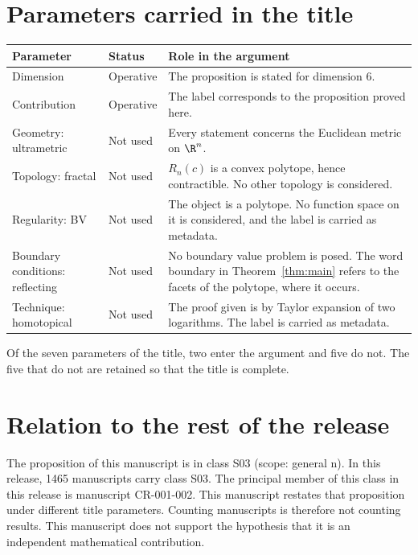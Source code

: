 \documentclass[11pt]{article}
\begin{document}
\section{Parameters carried in the title}\label{sec:params}
\begin{center}
\small
\begin{tabular}{p{}p{}p{}}
\toprule
Parameter & Status & Role in the argument \\
\midrule
Dimension & Operative & The proposition is stated for dimension $6$. \\
Contribution & Operative & The label corresponds to the proposition proved here. \\
Geometry: ultrametric & Not used & Every statement concerns the Euclidean metric on $\R^n$. \\
Topology: fractal & Not used & $R_n(c)$ is a convex polytope, hence contractible. No other topology is considered. \\
Regularity: BV & Not used & The object is a polytope. No function space on it is considered, and the label is carried as metadata. \\
Boundary conditions: reflecting & Not used & No boundary value problem is posed. The word boundary in Theorem~\ref{thm:main} refers to the facets of the polytope, where it occurs. \\
Technique: homotopical & Not used & The proof given is by Taylor expansion of two logarithms. The label is carried as metadata. \\
\bottomrule
\end{tabular}
\end{center}
Of the seven parameters of the title, two enter the argument and five do not. The five that do not are retained so that the title is complete.

\section{Relation to the rest of the release}
The proposition of this manuscript is in class S03 (scope: general n).
In this release, 1465 manuscripts carry class S03. The principal member of this class in this release is manuscript CR-001-002. This manuscript restates that proposition under different title parameters.
Counting manuscripts is therefore not counting results. This manuscript does not support the hypothesis that it is an independent mathematical contribution.
\end{document}
